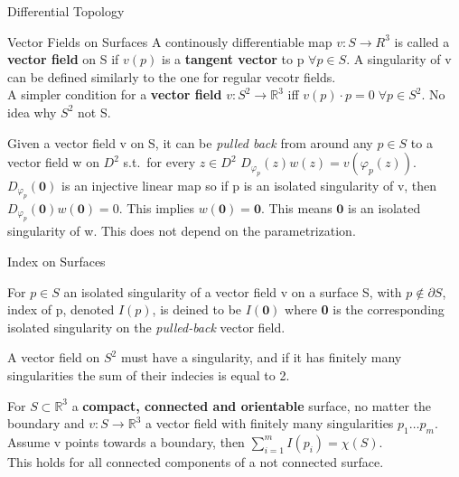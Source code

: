 \documentclass[12pt, letterpaper]{article}
\begin{document}
\begin{section}{Differential Topology}
\begin{subsection}{Vector Fields on Surfaces}
    A continously differentiable map \(v: S \to R^{3}\) is called a \textbf{vector field}
    on S if \(v(p)\) is a \textbf{tangent vector} to p \(\forall p \in S\). A
    singularity of v can be defined similarly to the one for regular vecotr fields. \\
    A simpler condition for a \textbf{vector field} \(v: S^{2} \to \mathbb{R}^{3}\)
    iff \(v(p) \cdot p = 0 \; \forall p \in S^{2}\). No idea why \(S^{2}\) not S.

    Given a vector field v on S, it can be \textit{pulled back} from around any
    \(p \in S\) to a vector field w on \(D^{2}\) s.t.\ for every \(z \in D^{2}\)
    \(D_{\varphi_{p}}(z)w(z) = v(\varphi_{p}(z))\). \\
    \(D_{\varphi_{p}}(\textbf{0})\) is an injective linear map so if p is an
    isolated singularity of v, then \(D_{\varphi_{p}}(\textbf{0})w(\textbf{0}) = 0\).
    This implies \(w(\textbf{0}) = \textbf{0}\). This means \(\textbf{0}\) is an
    isolated singularity of w. This does not depend on the parametrization.


  \end{subsection}

  \begin{subsection}{Index on Surfaces}

    For \(p \in S\) an isolated singularity of a vector field v on a surface
    S, with \(p \notin \partial S\), index of p, denoted \(I(p)\), is deined to be
    \(I(\textbf{0})\) where \textbf{0} is the corresponding isolated singularity
    on the \textit{pulled-back} vector field.

    A vector field on \(S^{2}\) must have a singularity, and if it has finitely
    many singularities the sum of their indecies is equal to 2.

    For \(S \subset \mathbb{R}^{3}\) a \textbf{compact, connected and orientable}
    surface, no matter the boundary and \(v: S \to \mathbb{R}^{3}\) a vector
    field with finitely many singularities \(p_{1} \dots p_{m}\). Assume v points
    towards a boundary, then \(\sum^{m}_{i = 1} I(p_{i}) = \chi(S)\). \\
    This holds for all connected components of a not connected surface.

  \end{subsection}

\end{section}
\end{document}
